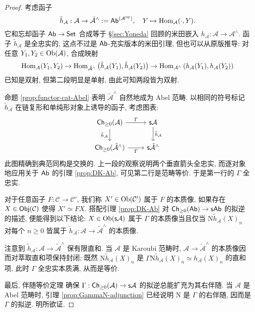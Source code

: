 \begin{proof}
	考虑函子
	\[ \tilde{h}_{\mathcal{A}}: \mathcal{A} \to \tilde{\mathcal{A}}^\wedge := \mathsf{Ab}^{(\mathcal{A}^{\operatorname{op}})}, \quad Y \mapsto \operatorname{Hom}_{\mathcal{A}}(\cdot, Y). \]
	它和忘却函子 $\mathsf{Ab} \to \mathsf{Set}$ 合成等于 \S\ref{sec:Yoneda} 回顾的米田嵌入 $h_{\mathcal{A}}: \mathcal{A} \to \mathcal{A}^\wedge$. 函子 $\tilde{h}_{\mathcal{A}}$ 是全忠实的, 这点不过是 $\mathsf{Ab}$-充实版本的米田引理, 但也可以从原版推导: 对任意 $Y_1, Y_2 \in \operatorname{Ob}(\mathcal{A})$, 合成映射
	\[ \operatorname{Hom}_{\mathcal{A}}(Y_1, Y_2) \to \operatorname{Hom}_{\tilde{\mathcal{A}}^\wedge}\left(\tilde{h}_{\mathcal{A}}(Y_1), \tilde{h}_{\mathcal{A}}(Y_2) \right) \to \operatorname{Hom}_{\mathcal{A}^\wedge}\left( h_{\mathcal{A}}(Y_1), h_{\mathcal{A}}(Y_2)\right) \]
	已知是双射, 但第二段明显是单射, 由此可知两段皆为双射.
	
	命题 \ref{prop:functor-cat-Abel} 表明 $\tilde{\mathcal{A}}^\wedge$ 自然地成为 Abel 范畴. 以相同的符号标记 $\tilde{h}_{\mathcal{A}}$ 在链复形和单纯形对象上诱导的函子, 考虑图表:
	\begin{equation*}\begin{tikzcd}
		\cate{Ch}_{\geq 0}(\mathcal{A}) \arrow[d, "{\tilde{h}_{\mathcal{A}}}"'] \arrow[r, "\Gamma"] & \cate{s}\mathcal{A} \arrow[d, "{\tilde{h}_{\mathcal{A}}}"] \\
		\cate{Ch}_{\geq 0}(\tilde{\mathcal{A}}^\wedge) \arrow[r, "\Gamma"'] & \cate{s}\tilde{\mathcal{A}}^\wedge
	\end{tikzcd}\end{equation*}
	此图精确到典范同构是交换的. 上一段的观察说明两个垂直箭头全忠实, 而逐对象地应用关于 $\mathsf{Ab}$ 的引理 \ref{prop:DK-Ab}, 可见第二行是范畴等价. 于是第一行的 $\Gamma$ 全忠实.
	
	对于任意函子 $F: \mathcal{C} \to \mathcal{C}'$, 我们称 $X' \in \operatorname{Ob}(\mathcal{C}')$ 属于 $F$ 的本质像, 如果存在 $X \in \mathsf{Obj}(\mathcal{C})$ 使得 $X' \simeq FX$. 搭配引理 \ref{prop:DK-Ab} 对 $\mathsf{Ch}_{\geq 0}(\mathsf{Ab}) \to \mathsf{s}\mathsf{Ab}$ 的拟逆的描述, 便能得到以下结论: $X \in \operatorname{Ob}(\mathsf{s}\mathcal{A})$ 属于 $\Gamma$ 的本质像当且仅当 $\mathrm{N} \tilde{h}_{\mathcal{A}}(X)_n$ 对每个 $n \geq 0$ 皆属于 $\tilde{h}_{\mathcal{A}}: \mathcal{A} \to \tilde{\mathcal{A}}^\wedge$ 的本质像.
	
	注意到 $\tilde{h}_{\mathcal{A}}: \mathcal{A} \to \tilde{\mathcal{A}}^\wedge$ 保有限直和.
	当 $\mathcal{A}$ 是 Karoubi 范畴时, $\mathcal{A} \to \tilde{\mathcal{A}}^\wedge$ 的本质像因而对萃取直和项保持封闭; 既然 $\mathrm{N} \tilde{h}_{\mathcal{A}}(X)_n$ 是 $\Gamma\mathrm{N} \tilde{h}_{\mathcal{A}}(X)_n \simeq h_{\mathcal{A}}(X)_n$ 的直和项, 此时 $\Gamma$ 全忠实本质满, 从而是等价.
	
	最后, 伴随等价定理 \cite[定理 2.6.12]{Li1} 确保 $\Gamma: \mathsf{Ch}_{\geq 0}(\mathcal{A}) \to \mathsf{s}\mathcal{A}$ 的拟逆总能扩充为其右伴随. 当 $\mathcal{A}$ 是 Abel 范畴时, 引理 \ref{prop:GammaN-adjunction} 已经说明 $\mathrm{N}$ 是 $\Gamma$ 的右伴随, 因而是 $\Gamma$ 的拟逆. 明所欲证.
\end{proof}

